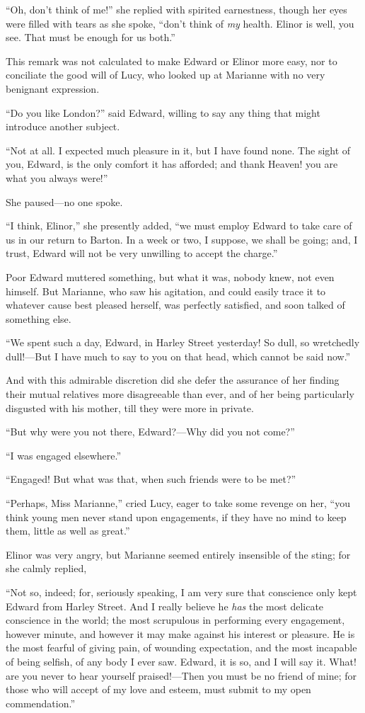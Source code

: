 \documentclass{article}
\begin{document}
``Oh, don't think of me!'' she replied with spirited
earnestness, though her eyes were filled with tears
as she spoke, ``don't think of \emph{my} health.  Elinor is well,
you see.  That must be enough for us both.''

This remark was not calculated to make Edward or
Elinor more easy, nor to conciliate the good will of Lucy,
who looked up at Marianne with no very benignant expression.

``Do you like London?'' said Edward, willing to say
any thing that might introduce another subject.

``Not at all.  I expected much pleasure in it,
but I have found none.  The sight of you, Edward, is the
only comfort it has afforded; and thank Heaven! you
are what you always were!''

She paused---no one spoke.

``I think, Elinor,'' she presently added, ``we must
employ Edward to take care of us in our return to Barton.
In a week or two, I suppose, we shall be going; and, I trust,
Edward will not be very unwilling to accept the charge.''

Poor Edward muttered something, but what it was,
nobody knew, not even himself.  But Marianne, who saw
his agitation, and could easily trace it to whatever
cause best pleased herself, was perfectly satisfied,
and soon talked of something else.

``We spent such a day, Edward, in Harley Street
yesterday!  So dull, so wretchedly dull!---But I have much
to say to you on that head, which cannot be said now.''

And with this admirable discretion did she defer
the assurance of her finding their mutual relatives more
disagreeable than ever, and of her being particularly
disgusted with his mother, till they were more in private.

``But why were you not there, Edward?---Why did you
not come?''

``I was engaged elsewhere.''

``Engaged!  But what was that, when such friends
were to be met?''

``Perhaps, Miss Marianne,'' cried Lucy, eager to take
some revenge on her, ``you think young men never stand
upon engagements, if they have no mind to keep them,
little as well as great.''

Elinor was very angry, but Marianne seemed entirely
insensible of the sting; for she calmly replied,

``Not so, indeed; for, seriously speaking, I am very
sure that conscience only kept Edward from Harley Street.
And I really believe he \emph{has} the most delicate conscience
in the world; the most scrupulous in performing
every engagement, however minute, and however it
may make against his interest or pleasure.  He is the
most fearful of giving pain, of wounding expectation,
and the most incapable of being selfish, of any body
I ever saw.  Edward, it is so, and I will say it.
What! are you never to hear yourself praised!---Then you
must be no friend of mine; for those who will accept
of my love and esteem, must submit to my open commendation.''
\end{document}
